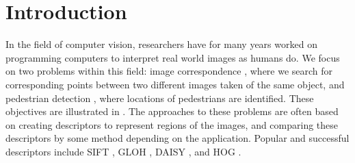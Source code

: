 \documentclass[thesis.tex]{subfiles}
\begin{document}
\chapter{Introduction}
\label{sec:introduction}

In the field of computer vision, researchers have for many years worked on programming computers to interpret real world images as humans do. We focus on two problems within this field: image correspondence \cite{dahl2011finding}, where we search for corresponding points between two different images taken of the same object, and pedestrian detection \cite{felzenszwalb2008discriminatively}, where locations of pedestrians are identified. These objectives are illustrated in . The approaches to these problems are often based on creating descriptors to represent regions of the images, and comparing these descriptors by some method depending on the application. Popular and successful descriptors include SIFT \cite{lowe2004distinctive}, GLOH \cite{mikolajczyk2005performance}, DAISY \cite{tola2008fast}, and HOG \cite{dalal2005histograms,felzenszwalb2009object}.
\end{document}
